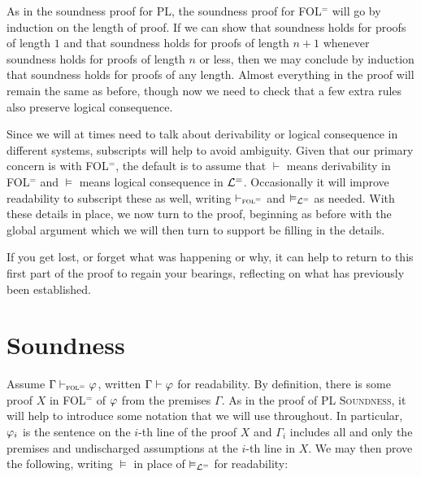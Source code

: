 As in the soundness proof for PL, the soundness proof for FOL$^=$ will go by induction on the length of proof.
If we can show that soundness holds for proofs of length $1$ and that soundness holds for proofs of length $n+1$ whenever soundness holds for proofs of length $n$ or less, then we may conclude by induction that soundness holds for proofs of any length.
Almost everything in the proof will remain the same as before, though now we need to check that a few extra rules also preserve logical consequence.

Since we will at times need to talk about derivability or logical consequence in different systems, subscripts will help to avoid ambiguity.
Given that our primary concern is with FOL$^=$, the default is to assume that $\vdash$ means derivability in FOL$^=$ and $\vDash$ means logical consequence in $\mathcal{L}^{=}$. 
Occasionally it will improve readability to subscript these as well, writing $\vdash_{\textsc{fol}^=}$ and $\vDash_{\mathcal{L}^{=}}$ as needed.
With these details in place, we now turn to the proof, beginning as before with the global argument which we will then turn to support be filling in the details.

If you get lost, or forget what was happening or why, it can help to return to this first part of the proof to regain your bearings, reflecting on what has previously been established.





\section{Soundness}%
  \label{sec:FOL-Soundness}

Assume $\Gamma \vdash_{\textsc{fol}^=} \varphi$, written $\Gamma \vdash \varphi$ for readability.
By definition, there is some proof $X$ in FOL$^=$ of $\varphi$ from the premises $\Gamma$. 
As in the proof of \textsc{PL Soundness}, it will help to introduce some notation that we will use throughout.
In particular, $\varphi_i$ is the sentence on the $i$-th line of the proof $X$ and $\Gamma_i$ includes all and only the premises and undischarged assumptions at the $i$-th line in $X$.
We may then prove the following, writing $\vDash$ in place of $\vDash_{\mathcal{L}^{=}}$ for readability:


